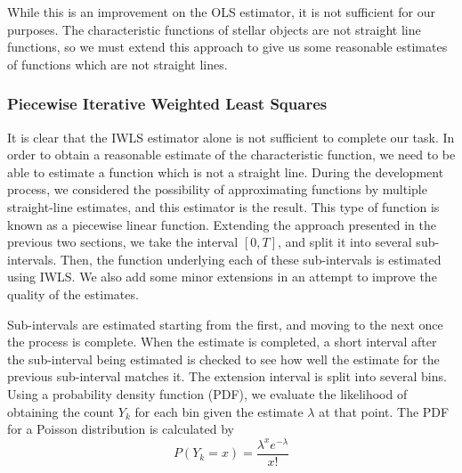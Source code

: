 \documentclass[a4paper,11pt,twoside]{article}
\begin{document}
    While this is an improvement on the OLS estimator, it is not sufficient for
    our purposes. The characteristic functions of stellar objects are not
    straight line functions, so we must extend this approach to give us some
    reasonable estimates of functions which are not straight lines.
\subsubsection{Piecewise Iterative Weighted Least Squares}
\label{sec-4-1-3}

    It is clear that the IWLS estimator alone is not sufficient to complete our
    task. In order to obtain a reasonable estimate of the characteristic
    function, we need to be able to estimate a function which is not a straight
    line. During the development process, we considered the possibility of
    approximating functions by multiple straight-line estimates, and this
    estimator is the result. This type of function is known as a piecewise
    linear function. Extending the approach presented in the previous two
    sections, we take the interval $[0,T]$, and split it into several
    sub-intervals. Then, the function underlying each of these sub-intervals is
    estimated using IWLS. We also add some minor extensions in an attempt to
    improve the quality of the estimates.

    Sub-intervals are estimated starting from the first, and moving to the next
    once the process is complete. When the estimate is completed, a short
    interval after the sub-interval being estimated is checked to see how well
    the estimate for the previous sub-interval matches it. The extension
    interval is split into several bins. Using a probability density function
    (PDF), we evaluate the likelihood of obtaining the count $Y_k$ for each bin
    given the estimate $\lambda$ at that point. The PDF for a Poisson
    distribution is calculated by
    \begin{equation}
    P(Y_k=x)=\frac{\lambda^xe^{-\lambda}}{x!}
    \end{equation}
    
\end{document}
